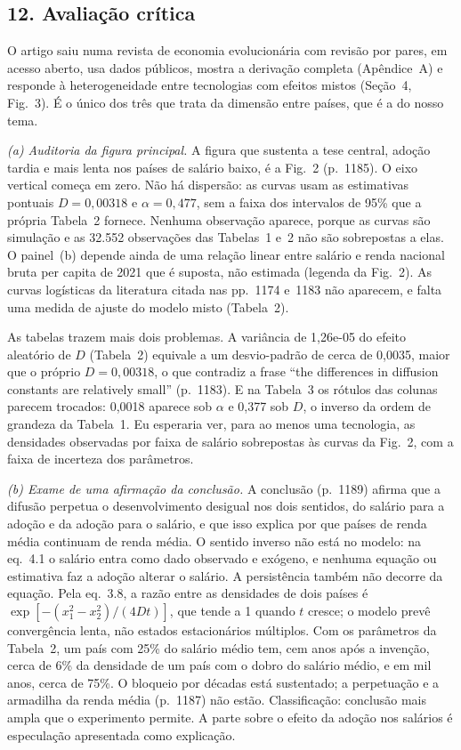 \subsection*{12. Avaliação crítica}
O artigo saiu numa revista de economia evolucionária com revisão por pares, em acesso aberto, usa
dados públicos, mostra a derivação completa (Apêndice~A) e responde à heterogeneidade entre
tecnologias com efeitos mistos (Seção~4, Fig.~3). É o único dos três que trata da dimensão entre
países, que é a do nosso tema.

\textit{(a) Auditoria da figura principal.} A figura que sustenta a tese central, adoção tardia e
mais lenta nos países de salário baixo, é a Fig.~2 (p.~1185). O eixo vertical começa em zero. Não
há dispersão: as curvas usam as estimativas pontuais $D = 0{,}00318$ e $\alpha = 0{,}477$, sem a
faixa dos intervalos de 95\% que a própria Tabela~2 fornece. Nenhuma observação aparece, porque as
curvas são simulação e as 32.552 observações das Tabelas~1 e~2 não são sobrepostas a elas. O
painel~(b) depende ainda de uma relação linear entre salário e renda nacional bruta per capita de
2021 que é suposta, não estimada (legenda da Fig.~2). As curvas logísticas da literatura citada nas
pp.~1174 e~1183 não aparecem, e falta uma medida de ajuste do modelo misto (Tabela~2).

As tabelas trazem mais dois problemas. A variância de 1,26e-05 do efeito aleatório de $D$
(Tabela~2) equivale a um desvio-padrão de cerca de 0,0035, maior que o próprio $D = 0{,}00318$, o
que contradiz a frase ``the differences in diffusion constants are relatively small'' (p.~1183). E
na Tabela~3 os rótulos das colunas parecem trocados: 0,0018 aparece sob $\alpha$ e 0,377 sob $D$, o
inverso da ordem de grandeza da Tabela~1. Eu esperaria ver, para ao menos uma tecnologia, as
densidades observadas por faixa de salário sobrepostas às curvas da Fig.~2, com a faixa de
incerteza dos parâmetros.

\textit{(b) Exame de uma afirmação da conclusão.} A conclusão (p.~1189) afirma que a difusão
perpetua o desenvolvimento desigual nos dois sentidos, do salário para a adoção e da adoção para o
salário, e que isso explica por que países de renda média continuam de renda média. O sentido
inverso não está no modelo: na eq.~4.1 o salário entra como dado observado e exógeno, e nenhuma
equação ou estimativa faz a adoção alterar o salário. A persistência também não decorre da equação.
Pela eq.~3.8, a razão entre as densidades de dois países é $\exp[-(x_1^2-x_2^2)/(4Dt)]$, que tende a 1
quando $t$ cresce; o modelo prevê convergência lenta, não estados estacionários múltiplos. Com os
parâmetros da Tabela~2, um país com 25\% do salário médio tem, cem anos após a invenção, cerca de
6\% da densidade de um país com o dobro do salário médio, e em mil anos, cerca de 75\%. O bloqueio
por décadas está sustentado; a perpetuação e a armadilha da renda média (p.~1187) não estão.
Classificação: conclusão mais ampla que o experimento permite. A parte sobre o efeito da adoção nos
salários é especulação apresentada como explicação.
